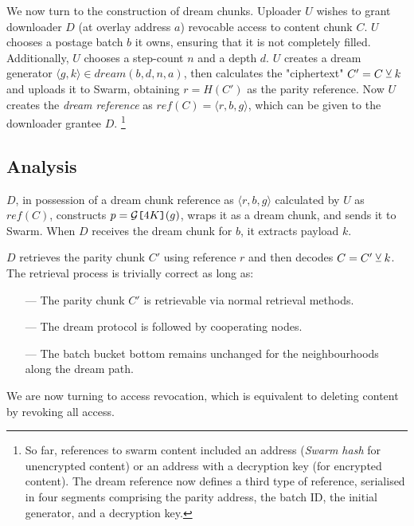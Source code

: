 We now turn to the construction of dream chunks. 
Uploader $U$ wishes to grant downloader $D$ (at overlay address $a$) revocable  access to content chunk $C$.
$U$  chooses a postage batch $b$ it owns, ensuring that it is not completely filled. Additionally, $U$ chooses a step-count $n$ and a depth $d$.
$U$ creates a dream generator $\langle g, k\rangle\in\mathit{dream}(b,d,n,a)$, then calculates the "ciphertext" $C'=C \veebar k$ and uploads it to Swarm, obtaining $r=\mathit{H}(C')$ as the parity reference. Now $U$ creates the \emph{dream reference} as $\mathit{ref}(C)=\langle r,b,g\rangle $, which can be given to the downloader grantee $D$.%
%
\footnote{So far, references to swarm content included an address (\emph{Swarm hash} for unencrypted content) or an address with a decryption key (for encrypted content). The dream reference now defines a third type of reference, serialised in four segments comprising the parity address, the batch ID, the initial generator, and a decryption key.}

\subsection{Analysis}

$D$, in possession of a dream chunk reference as 
$\langle r,b,g\rangle $ calculated by $U$  as $\mathit{ref}(C)$, constructs $p=\mathcal{G}\texttt{[}\/4K\/\texttt{]}(g)$, wraps it as a dream chunk, and sends it to Swarm. When $D$ receives the dream chunk for $b$, it extracts payload $k$.

$D$ retrieves the parity chunk $C'$ using reference $r$ and then decodes $C=C'\veebar k$.
The retrieval process is trivially correct as long as: 
\begin{enumerate}[noitemsep]
\item[---]  The parity chunk $C'$ is retrievable via normal retrieval methods. 
\item[---] The dream protocol is followed by cooperating nodes.
\item[---] The batch bucket bottom remains unchanged for the neighbourhoods along the dream path. 
\end{enumerate}

We are now turning to access revocation, which is equivalent to deleting content by revoking all access.


